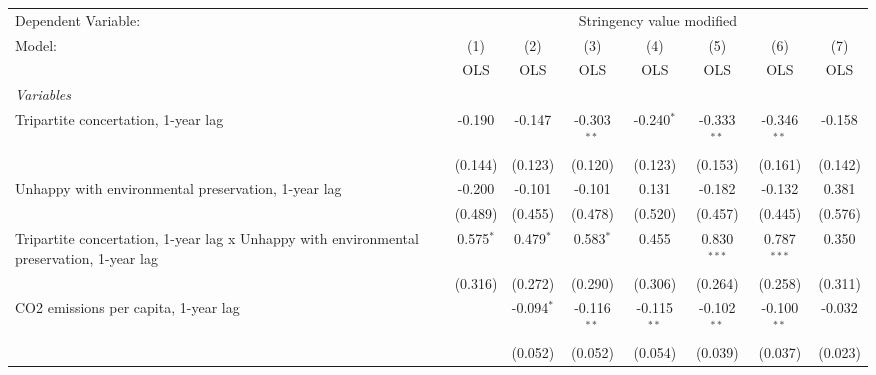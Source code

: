 
\begingroup
\centering
\begin{tabular}{lccccccc}
   \toprule
   Dependent Variable: & \multicolumn{7}{c}{Stringency value modified}\\
   Model:                                                                                    & (1)         & (2)          & (3)           & (4)           & (5)           & (6)           & (7)\\  
                                                                                             &  OLS        & OLS          & OLS           & OLS           & OLS           & OLS           & OLS\\  
   \midrule
   \emph{Variables}\\
   Tripartite concertation, 1-year lag                                                       & -0.190      & -0.147       & -0.303$^{**}$ & -0.240$^{*}$  & -0.333$^{**}$ & -0.346$^{**}$ & -0.158\\   
                                                                                             & (0.144)     & (0.123)      & (0.120)       & (0.123)       & (0.153)       & (0.161)       & (0.142)\\   
   Unhappy with environmental preservation, 1-year lag                                       & -0.200      & -0.101       & -0.101        & 0.131         & -0.182        & -0.132        & 0.381\\   
                                                                                             & (0.489)     & (0.455)      & (0.478)       & (0.520)       & (0.457)       & (0.445)       & (0.576)\\   
   Tripartite concertation, 1-year lag x Unhappy with environmental preservation, 1-year lag & 0.575$^{*}$ & 0.479$^{*}$  & 0.583$^{*}$   & 0.455         & 0.830$^{***}$ & 0.787$^{***}$ & 0.350\\   
                                                                                             & (0.316)     & (0.272)      & (0.290)       & (0.306)       & (0.264)       & (0.258)       & (0.311)\\   
   CO2 emissions per capita, 1-year lag                                                      &             & -0.094$^{*}$ & -0.116$^{**}$ & -0.115$^{**}$ & -0.102$^{**}$ & -0.100$^{**}$ & -0.032\\   
                                                                                             &             & (0.052)      & (0.052)       & (0.054)       & (0.039)       & (0.037)       & (0.023)\\   

\end{tabular}
